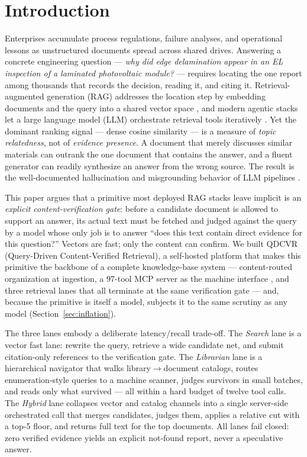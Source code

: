 \documentclass[preprint,12pt]{elsarticle}
\begin{document}

\section{Introduction}
\label{sec:intro}

Enterprises accumulate process regulations, failure analyses, and operational
lessons as unstructured documents spread across shared drives. Answering a
concrete engineering question --- \emph{why did edge delamination appear in an
EL inspection of a laminated photovoltaic module?} --- requires locating the
one report among thousands that records the decision, reading it, and citing
it. Retrieval-augmented generation (RAG) addresses the location step by
embedding documents and the query into a shared vector space
\cite{rag-lewis,dpr}, and modern agentic stacks let a large language model
(LLM) orchestrate retrieval tools iteratively \cite{mcp,singh-agentic-rag}.
Yet the dominant ranking signal --- dense cosine similarity --- is a measure
of \emph{topic relatedness}, not of \emph{evidence presence}. A document that
merely discusses similar materials can outrank the one document that contains
the answer, and a fluent generator can readily synthesize an answer from the
wrong source. The result is the well-documented hallucination and
misgrounding behavior of LLM pipelines \cite{siren}.

This paper argues that a primitive most deployed RAG stacks leave implicit
is an \emph{explicit content-verification gate}: before a candidate document
is allowed to support an answer, its actual text must be fetched and judged
against the query by a model whose only job is to answer ``does this text
contain direct evidence for this question?'' Vectors are fast; only the
content can confirm. We built QDCVR (Query-Driven Content-Verified Retrieval), a
self-hosted platform that makes this primitive the backbone of a complete
knowledge-base system --- content-routed organization at ingestion, a
97-tool MCP server as the machine interface \cite{mcp}, and three retrieval
lanes that all terminate at the same verification gate --- and, because the
primitive is itself a model, subjects it to the same scrutiny as any model
(Section~\ref{sec:inflation}).

The three lanes embody a deliberate latency/recall trade-off. The
\emph{Search} lane is a vector fast lane: rewrite the query, retrieve a wide
candidate net, and submit citation-only references to the verification gate. The
\emph{Librarian} lane is a hierarchical navigator that walks
library$\to$document catalogs, routes enumeration-style queries to a machine
scanner, judges survivors in small batches, and reads only what survived ---
all within a hard budget of twelve tool calls. The \emph{Hybrid} lane
collapses vector and catalog channels into a single server-side orchestrated
call that merges candidates, judges them, applies a relative cut with a
top-5 floor, and returns full text for the top documents. All lanes fail
closed: zero verified evidence yields an explicit not-found report, never a
speculative answer.
\end{document}
